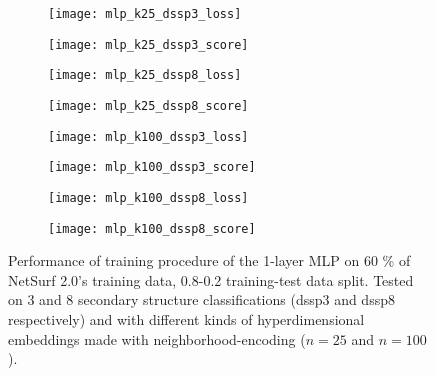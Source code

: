   \begin{figure}[htbp]
    \centering
    \begin{subfigure}{0.48\textwidth}
        \texttt{[image: mlp\_k25\_dssp3\_loss]}
        \label{fig:subfig}
    \end{subfigure}
    \hfill
    \begin{subfigure}{0.48\textwidth}
        \texttt{[image: mlp\_k25\_dssp3\_score]}
        \label{fig:subfi}
    \end{subfigure}
    
    \begin{subfigure}{0.48\textwidth}
        \texttt{[image: mlp\_k25\_dssp8\_loss]}
        \label{fig:subf}
    \end{subfigure}
    \hfill
    \begin{subfigure}{0.48\textwidth}
        \texttt{[image: mlp\_k25\_dssp8\_score]}
        \label{fig:sub}
    \end{subfigure}
    
    \begin{subfigure}{0.48\textwidth}
        \texttt{[image: mlp\_k100\_dssp3\_loss]}
        \label{fig:su}
    \end{subfigure}
    \hfill
    \begin{subfigure}{0.48\textwidth}
        \texttt{[image: mlp\_k100\_dssp3\_score]}
        \label{fig:s}
    \end{subfigure}
    
    \begin{subfigure}{0.48\textwidth}
        \texttt{[image: mlp\_k100\_dssp8\_loss]}
        \label{fig:sg}
    \end{subfigure}
    \hfill
    \begin{subfigure}{0.48\textwidth}
        \texttt{[image: mlp\_k100\_dssp8\_score]}
        \label{fig:sh3}
    \end{subfigure}
    \caption{Performance of training procedure of the 1-layer MLP on 60 \% of NetSurf 2.0's training data, 0.8-0.2 training-test data split. Tested on 3 and 8 secondary structure classifications (dssp3 and dssp8 respectively) and with different kinds of hyperdimensional embeddings made with neighborhood-encoding ($n = 25$ and $n=100$).}
    \label{fig:main83}
  \end{figure}
